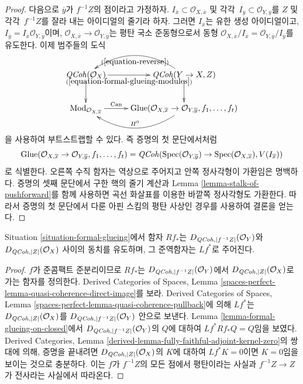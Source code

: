 \begin{proof}
\medskip\noindent
다음으로 $\overline{y}$가 $f^{-1}Z$의 점이라고 가정하자.
$I_{\overline{x}} \subset \mathcal{O}_{X, \overline{x}}$ 및
각각\ $I_{\overline{y}} \subset \mathcal{O}_{Y, \overline{y}}$를
$Z$ 및 각각\ $f^{-1}Z$를 잘라 내는 아이디얼의 줄기라 하자.
그러면 $I_{\overline{x}}$는 유한 생성 아이디얼이고,
$I_{\overline{y}} = I_{\overline{x}}\mathcal{O}_{Y, \overline{y}}$이며,
$\mathcal{O}_{X, \overline{x}} \to \mathcal{O}_{Y, \overline{y}}$는
평탄 국소 준동형으로서 동형
$\mathcal{O}_{X, \overline{x}}/I_{\overline{x}} =
\mathcal{O}_{Y, \overline{y}}/I_{\overline{y}}$를 유도한다.
이제 범주들의 도식
$$
\xymatrix{
\QCoh(\mathcal{O}_X) \ar[r]_-{(\ref{equation-formal-glueing-modules})} \ar[d] &
\QCoh(Y \to X, Z) \ar[d] \ar@/_2pc/[l]^{(\ref{equation-reverse})} \\
\text{Mod}_{\mathcal{O}_{X, \overline{x}}} \ar[r]^-{\text{Can}} &
\text{Glue}(\mathcal{O}_{X, \overline{x}} \to \mathcal{O}_{Y, \overline{y}},
f_1, \ldots, f_t) \ar@/^2pc/[l]_{H^0}
}
$$
을 사용하여 부트스트랩할 수 있다. 즉 증명의 첫 문단에서처럼
$$
\text{Glue}(\mathcal{O}_{X, \overline{x}} \to \mathcal{O}_{Y, \overline{y}},
f_1, \ldots, f_t)
=
\mathit{QCoh}(\mathop{\mathrm{Spec}}(\mathcal{O}_{Y, \overline{y}}) \to
\mathop{\mathrm{Spec}}(\mathcal{O}_{X, \overline{x}}), V(I_{\overline{x}}))
$$
로 식별한다. 오른쪽 수직 함자는 역상으로 주어지고 안쪽 정사각형이
가환임은 명백하다. 증명의 셋째 문단에서 구한 핵의 줄기 계산과
Lemma \ref{lemma-stalk-of-pushforward}를 함께 사용하면 곡선 화살표를
이용한 바깥쪽 정사각형도 가환한다. 따라서 증명의 첫 문단에서 다룬
아핀 스킴의 평탄 사상인 경우를 사용하여 결론을 얻는다.
\end{proof}

\begin{lemma}
\label{lemma-derived-equivalent}
Situation \ref{situation-formal-glueing}에서 함자 $Rf_*$는
$D_{\mathit{QCoh}, |f^{-1}Z|}(\mathcal{O}_Y)$와
$D_{\mathit{QCoh}, |Z|}(\mathcal{O}_X)$ 사이의 동치를 유도하며,
그 준역함자는 $Lf^*$로 주어진다.
\end{lemma}

\begin{proof}
$f$가 준콤팩트 준분리이므로 $Rf_*$는
$D_{\mathit{QCoh}, |f^{-1}Z|}(\mathcal{O}_Y)$에서
$D_{\mathit{QCoh}, |Z|}(\mathcal{O}_X)$로 가는 함자를 정의한다.
Derived Categories of Spaces, Lemma
\ref{spaces-perfect-lemma-quasi-coherence-direct-image}를 보라.
Derived Categories of Spaces, Lemma
\ref{spaces-perfect-lemma-quasi-coherence-pullback}에 의해 $Lf^*$는
$D_{\mathit{QCoh}, |Z|}(\mathcal{O}_X)$를
$D_{\mathit{QCoh}, |f^{-1}Z|}(\mathcal{O}_Y)$ 안으로 보낸다.
Lemma \ref{lemma-formal-glueing-on-closed}에서
$D_{\mathit{QCoh}, |f^{-1}Z|}(\mathcal{O}_Y)$의 $Q$에 대하여
$Lf^*Rf_*Q = Q$임을 보였다. Derived Categories, Lemma
\ref{derived-lemma-fully-faithful-adjoint-kernel-zero}의 쌍대에 의해,
증명을 끝내려면 $D_{\mathit{QCoh}, |Z|}(\mathcal{O}_X)$의 $K$에 대하여
$Lf^*K = 0$이면 $K = 0$임을 보이는 것으로 충분하다. 이는 $f$가
$f^{-1}Z$의 모든 점에서 평탄이라는 사실과 $f^{-1}Z \to Z$가
전사라는 사실에서 따라온다.
\end{proof}

